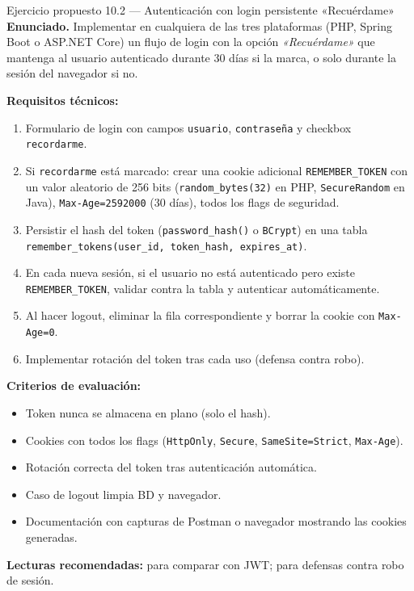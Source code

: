\documentclass[11pt,a4paper,openany]{book}
\begin{document}
\begin{cajaejercicio}{Ejercicio propuesto 10.2 --- Autenticación con login persistente «Recuérdame»}
\textbf{Enunciado.} Implementar en cualquiera de las tres plataformas
(PHP, Spring Boot o ASP.NET Core) un flujo de login con la opción
\emph{«Recuérdame»} que mantenga al usuario autenticado durante 30
días si la marca, o solo durante la sesión del navegador si no.

\textbf{Requisitos técnicos:}
\begin{enumerate}
\item Formulario de login con campos \texttt{usuario},
\texttt{contraseña} y checkbox \texttt{recordarme}.
\item Si \texttt{recordarme} está marcado: crear una cookie
adicional \texttt{REMEMBER\_TOKEN} con un valor aleatorio de 256 bits
(\texttt{random\_bytes(32)} en PHP, \texttt{SecureRandom} en Java),
\texttt{Max-Age=2592000} (30 días), todos los flags de seguridad.
\item Persistir el hash del token (\texttt{password\_hash()} o
\texttt{BCrypt}) en una tabla \texttt{remember\_tokens(user\_id,
token\_hash, expires\_at)}.
\item En cada nueva sesión, si el usuario no está autenticado pero
existe \texttt{REMEMBER\_TOKEN}, validar contra la tabla y
autenticar automáticamente.
\item Al hacer logout, eliminar la fila correspondiente y borrar la
cookie con \texttt{Max-Age=0}.
\item Implementar rotación del token tras cada uso (defensa contra
robo).
\end{enumerate}

\textbf{Criterios de evaluación:}
\begin{itemize}
\item Token nunca se almacena en plano (solo el hash).
\item Cookies con todos los flags (\texttt{HttpOnly},
\texttt{Secure}, \texttt{SameSite=Strict}, \texttt{Max-Age}).
\item Rotación correcta del token tras autenticación automática.
\item Caso de logout limpia BD y navegador.
\item Documentación con capturas de Postman o navegador mostrando
las cookies generadas.
\end{itemize}

\textbf{Lecturas recomendadas:} \cite{jones2015jwt} para
comparar con JWT; \cite{ortega2022securecoding} para defensas
contra robo de sesión.
\end{cajaejercicio}
\end{document}
